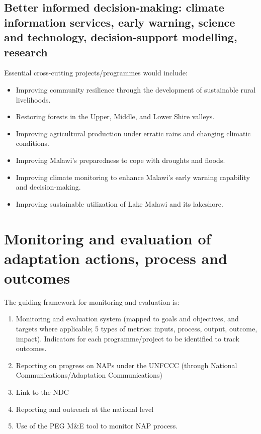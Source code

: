 \documentclass[
]{book}
\providecommand{\tightlist}{%
  \setlength{\itemsep}{0pt}\setlength{\parskip}{0pt}}
\begin{document}
\hypertarget{better-informed-decision-making-climate-information-services-early-warning-science-and-technology-decision-support-modelling-research}{%
\section{Better informed decision-making: climate information services, early warning, science and technology, decision-support modelling, research}\label{better-informed-decision-making-climate-information-services-early-warning-science-and-technology-decision-support-modelling-research}}

Essential cross-cutting projects/programmes would include:

\begin{itemize}
\tightlist
\item
  Improving community resilience through the development of sustainable rural livelihoods.
\item
  Restoring forests in the Upper, Middle, and Lower Shire valleys.
\item
  Improving agricultural production under erratic rains and changing climatic conditions.
\item
  Improving Malawi's preparedness to cope with droughts and floods.
\item
  Improving climate monitoring to enhance Malawi's early warning capability and decision-making.
\item
  Improving sustainable utilization of Lake Malawi and its lakeshore.
\end{itemize}

\hypertarget{monitoring-and-evaluation-of-adaptation-actions-process-and-outcomes}{%
\chapter{Monitoring and evaluation of adaptation actions, process and outcomes}\label{monitoring-and-evaluation-of-adaptation-actions-process-and-outcomes}}

The guiding framework for monitoring and evaluation is:

\begin{enumerate}
\def\labelenumi{\alph{enumi}.}
\tightlist
\item
  Monitoring and evaluation system (mapped to goals and objectives, and targets where applicable; 5 types of metrics: inputs, process, output, outcome, impact). Indicators for each programme/project to be identified to track outcomes.
\item
  Reporting on progress on NAPs under the UNFCCC (through National Communications/Adaptation Communications)
\item
  Link to the NDC
\item
  Reporting and outreach at the national level
\item
  Use of the PEG M\&E tool to monitor NAP process.
\end{enumerate}
\end{document}

